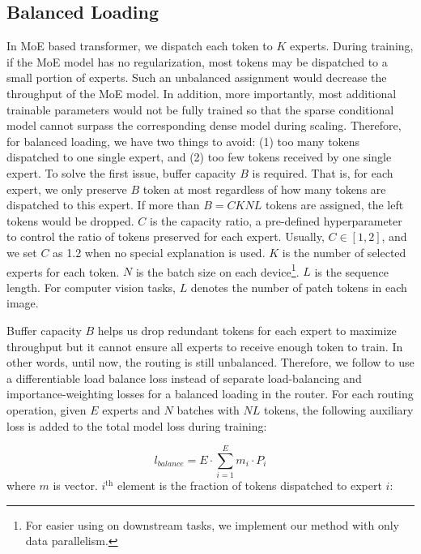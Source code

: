 \documentclass[letterpaper]{article} \usepackage{aaai22}  \usepackage{times}  \usepackage{helvet}  \usepackage{courier}  \usepackage[hyphens]{url}  \usepackage{graphicx} \urlstyle{rm} \def\UrlFont{\rm}  \usepackage{natbib}  \usepackage{caption} \DeclareCaptionStyle{ruled}{labelfont=normalfont,labelsep=colon,strut=off} \frenchspacing  \setlength{\pdfpagewidth}{8.5in}  \setlength{\pdfpageheight}{11in}  \usepackage{algorithm}
\begin{document}
\subsection{Balanced Loading}




In MoE based transformer, we dispatch each token to $K$ experts. During training, if the MoE model has no regularization, most tokens may be dispatched to a small portion of experts. Such an unbalanced assignment would decrease the throughput of the MoE model. In addition, more importantly, most additional trainable parameters would not be fully trained so that the sparse conditional model cannot surpass the corresponding dense model during scaling. Therefore, for balanced loading, we have two things to avoid: (1) too many tokens dispatched to one single expert, and (2) too few tokens received by one single expert. To solve the first issue, buffer capacity $B$ is required. That is, for each expert, we only preserve $B$ token at most regardless of how many tokens are dispatched to this expert. If more than $B=CKNL$ tokens are assigned, the left tokens would be dropped. $C$ is the capacity ratio, a pre-defined hyperparameter to control the ratio of tokens preserved for each expert. Usually, $C\in[1,2]$, and we set $C$ as 1.2 when no special explanation is used. $K$ is the number of selected experts for each token. $N$ is the batch size on each device\footnote{For easier using on downstream tasks, we implement our method with only data parallelism.}. $L$ is the sequence length. For computer vision tasks, $L$ denotes the number of patch tokens in each image. 

Buffer capacity $B$ helps us drop redundant tokens for each expert to maximize throughput but it cannot ensure all experts to receive enough token to train. In other words, until now, the routing is still unbalanced. Therefore, we follow \citet{fedus2021switch} to use a differentiable load balance loss instead of separate load-balancing and importance-weighting losses for a balanced loading in the router. For each routing operation, given $E$ experts and $N$ batches with $NL$ tokens, the following auxiliary loss is added to the total model loss during training: 



\begin{equation}\label{eq:balance_loss}
l_{balance} = E \cdot \sum_{i=1}^E m_i \cdot P_i
\end{equation}
where $m$ is vector. $i^{\mathrm{th}}$ element is the fraction of tokens dispatched to expert $i$:
\end{document}
